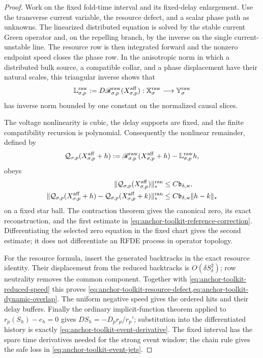 \begin{proof}
Work on the fixed fold-time interval and its fixed-delay enlargement.  Use
the transverse current variable, the resource defect, and a scalar phase
path as unknowns.  The linearized distributed equation is solved by the
stable current Green operator and, on the repelling branch, by the inverse
on the single current-unstable line.  The resource row is then integrated
forward and the nonzero endpoint speed closes the phase row.  In the
anisotropic norm in which a distributed bulk source, a compatible collar,
and a phase displacement have their natural scales, this triangular inverse
shows that
\[
 \mathbb L_{\sigma,p}^{\rm raw}
 :=D\mathscr R_{\sigma,p}^{\rm raw}(X_{\sigma,p}^{\rm aff})
 :\mathbb X_\sigma^{\rm raw}\longrightarrow\mathbb Y_\sigma^{\rm raw}
\]
has inverse norm bounded by one constant on the normalized causal slices.

The voltage nonlinearity is cubic, the delay supports are fixed, and the
finite compatibility recursion is polynomial.  Consequently the nonlinear
remainder, defined by
\[
 \mathcal Q_{\sigma,p}(X_{\sigma,p}^{\rm aff}+h)
 :=\mathscr R_{\sigma,p}^{\rm raw}(X_{\sigma,p}^{\rm aff}+h)
   -\mathbb L_{\sigma,p}^{\rm raw}h,
\]
obeys
\begin{align}
 \|\mathcal Q_{\sigma,p}(X^{\rm aff}_{\sigma,p})\|_*^{\rm ran}
 &\le C\mathfrak b_{\delta,\varkappa},\notag\\
 \|\mathcal Q_{\sigma,p}(X^{\rm aff}_{\sigma,p}+h)
       -\mathcal Q_{\sigma,p}(X^{\rm aff}_{\sigma,p}+k)\|_*^{\rm ran}
 &\le C\mathfrak b_{\delta,\varkappa}\|h-k\|_*
 \label{eq:anchor-toolkit-reference-two-point}
\end{align}
on a fixed star ball.  The contraction theorem gives the canonical zero,
its exact reconstruction, and the first estimate in
\cref{eq:anchor-toolkit-reference-correction}.  Differentiating the
selected zero equation in the fixed chart gives the second estimate; it
does not differentiate an RFDE process in operator topology.

For the resource formula, insert the generated backtracks in the exact
resource identity.  Their displacement from the reduced backtracks is
\(O(\delta S_\delta^2)\); row neutrality removes the common component.
Together with \cref{eq:anchor-toolkit-reduced-speed} this proves
\cref{eq:anchor-toolkit-resource-defect,eq:anchor-toolkit-dynamic-overlap}.
The uniform negative speed gives the ordered hits and their delay buffers.
Finally the ordinary implicit-function theorem applied to
\(r_p(S_h)-e_h=0\) gives
\(DS_h=-D_pr_p/r_p'\); substitution into the differentiated history is
exactly \cref{eq:anchor-toolkit-event-derivative}.  The fixed interval has
the spare time derivatives needed for the strong event window; the chain
rule gives the safe loss in \cref{eq:anchor-toolkit-event-jets}.
\end{proof}

